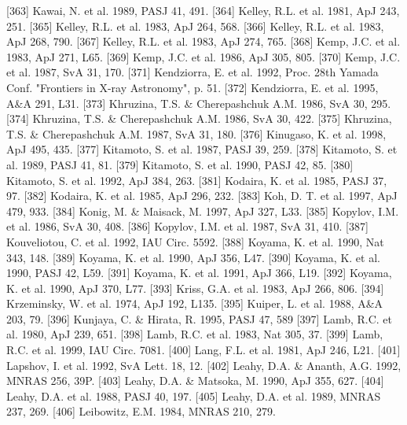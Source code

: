 \documentclass{aa}
\begin{document}
\begin{thebibliography}{}
\bibitem[]{}[363] Kawai, N. et al. 1989, PASJ 41, 491.
\bibitem[]{}[364] Kelley, R.L. et al. 1981, ApJ 243, 251.
\bibitem[]{}[365] Kelley, R.L. et al. 1983, ApJ 264, 568.
\bibitem[]{}[366] Kelley, R.L. et al. 1983, ApJ 268, 790.
\bibitem[]{}[367] Kelley, R.L. et al. 1983, ApJ 274, 765.
\bibitem[]{}[368] Kemp, J.C. et al. 1983, ApJ 271, L65.
\bibitem[]{}[369] Kemp, J.C. et al. 1986, ApJ 305, 805.
\bibitem[]{}[370] Kemp, J.C. et al. 1987, SvA 31, 170.
\bibitem[]{}[371] Kendziorra, E. et al. 1992, Proc. 28th Yamada Conf. "Frontiers in X-ray Astronomy", p. 51.
\bibitem[]{}[372] Kendziorra, E. et al. 1995, A\&A 291, L31.
\bibitem[]{}[373] Khruzina, T.S. \& Cherepashchuk A.M. 1986, SvA 30, 295.
\bibitem[]{}[374] Khruzina, T.S. \& Cherepashchuk A.M. 1986, SvA 30, 422.
\bibitem[]{}[375] Khruzina, T.S. \& Cherepashchuk A.M. 1987, SvA 31, 180.
\bibitem[]{}[376] Kinugaso, K. et al. 1998, ApJ 495, 435.
\bibitem[]{}[377] Kitamoto, S. et al. 1987, PASJ 39, 259.
\bibitem[]{}[378] Kitamoto, S. et al. 1989, PASJ 41, 81.
\bibitem[]{}[379] Kitamoto, S. et al. 1990, PASJ 42, 85.
\bibitem[]{}[380] Kitamoto, S. et al. 1992, ApJ 384, 263.
\bibitem[]{}[381] Kodaira, K. et al. 1985, PASJ 37, 97.
\bibitem[]{}[382] Kodaira, K. et al. 1985, ApJ 296, 232.
\bibitem[]{}[383] Koh, D. T. et al. 1997, ApJ 479, 933.
\bibitem[]{}[384] Konig, M. \& Maisack, M. 1997, ApJ 327, L33.
\bibitem[]{}[385] Kopylov, I.M. et al. 1986, SvA 30, 408.
\bibitem[]{}[386] Kopylov, I.M. et al. 1987, SvA 31, 410.
\bibitem[]{}[387] Kouveliotou, C. et al. 1992, IAU Circ. 5592.
\bibitem[]{}[388] Koyama, K. et al. 1990, Nat 343, 148.
\bibitem[]{}[389] Koyama, K. et al. 1990, ApJ 356, L47.
\bibitem[]{}[390] Koyama, K. et al. 1990, PASJ 42, L59.
\bibitem[]{}[391] Koyama, K. et al. 1991, ApJ 366, L19.
\bibitem[]{}[392] Koyama, K. et al. 1990, ApJ 370, L77.
\bibitem[]{}[393] Kriss, G.A. et al. 1983, ApJ 266, 806.
\bibitem[]{}[394] Krzeminsky, W. et al. 1974, ApJ 192, L135.
\bibitem[]{}[395] Kuiper, L. et al. 1988, A\&A 203, 79.
\bibitem[]{}[396] Kunjaya, C. \& Hirata, R. 1995, PASJ 47, 589 
\bibitem[]{}[397] Lamb, R.C. et al. 1980, ApJ 239, 651.
\bibitem[]{}[398] Lamb, R.C. et al. 1983, Nat 305, 37.
\bibitem[]{}[399] Lamb, R.C. et al. 1999, IAU Circ. 7081.
\bibitem[]{}[400] Lang, F.L. et al. 1981, ApJ 246, L21.
\bibitem[]{}[401] Lapshov, I. et al. 1992, SvA Lett. 18, 12.
\bibitem[]{}[402] Leahy, D.A. \& Ananth, A.G. 1992, MNRAS 256, 39P.
\bibitem[]{}[403] Leahy, D.A. \& Matsoka, M. 1990, ApJ 355, 627.
\bibitem[]{}[404] Leahy, D.A. et al. 1988, PASJ 40, 197.
\bibitem[]{}[405] Leahy, D.A. et al. 1989, MNRAS 237, 269.
\bibitem[]{}[406] Leibowitz, E.M. 1984, MNRAS 210, 279.

\end{thebibliography}
\end{document}
